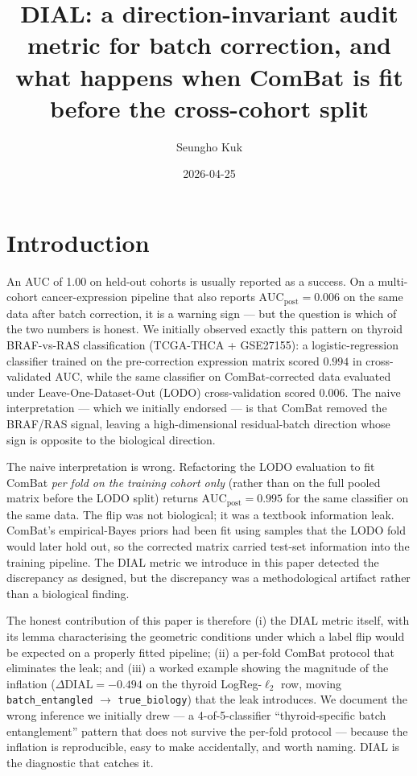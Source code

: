 \documentclass[11pt,a4paper]{article}
\title{DIAL: a direction-invariant audit metric for batch correction,
and what happens when ComBat is fit before the cross-cohort split}
\author[1,*]{Seungho Kuk}
\affil[1]{Independent research, Seoul, Republic of Korea}
\affil[*]{Corresponding author:
\href{mailto:kukshomr@gmail.com}{kukshomr@gmail.com}}
\date{2026-04-25}
\begin{document}
\maketitle



\section{Introduction}
\label{sec:intro}

An AUC of 1.00 on held-out cohorts is usually reported as a success.
On a multi-cohort cancer-expression pipeline that also reports
$\mathrm{AUC}_{\mathrm{post}} = 0.006$ on the same data after batch
correction, it is a warning sign --- but the question is which of
the two numbers is honest. We initially observed exactly this pattern
on thyroid BRAF-vs-RAS classification (TCGA-THCA + GSE27155): a
logistic-regression classifier trained on the pre-correction
expression matrix scored $0.994$ in cross-validated AUC, while the
same classifier on ComBat-corrected data evaluated under
Leave-One-Dataset-Out (LODO) cross-validation scored $0.006$. The
naive interpretation --- which we initially endorsed --- is that
ComBat removed the BRAF/RAS signal, leaving a high-dimensional
residual-batch direction whose sign is opposite to the biological
direction.

The naive interpretation is wrong. Refactoring the LODO evaluation
to fit ComBat \emph{per fold on the training cohort only} (rather
than on the full pooled matrix before the LODO split) returns
$\mathrm{AUC}_{\mathrm{post}} = 0.995$ for the same classifier on the
same data. The flip was not biological; it was a textbook information
leak. ComBat's empirical-Bayes priors had been fit using samples that
the LODO fold would later hold out, so the corrected matrix carried
test-set information into the training pipeline. The DIAL metric we
introduce in this paper detected the discrepancy as designed, but the
discrepancy was a methodological artifact rather than a biological
finding.

The honest contribution of this paper is therefore (i) the DIAL
metric itself, with its lemma characterising the geometric conditions
under which a label flip would be expected on a properly fitted
pipeline; (ii) a per-fold ComBat protocol that eliminates the leak;
and (iii) a worked example showing the magnitude of the inflation
($\Delta\mathrm{DIAL} = -0.494$ on the thyroid LogReg-$\ell_2$ row,
moving \texttt{batch\_entangled} $\to$ \texttt{true\_biology}) that
the leak introduces. We document the wrong inference we initially
drew --- a 4-of-5-classifier ``thyroid-specific batch entanglement''
pattern that does not survive the per-fold protocol --- because the
inflation is reproducible, easy to make accidentally, and worth
naming. DIAL is the diagnostic that catches it.
\end{document}
